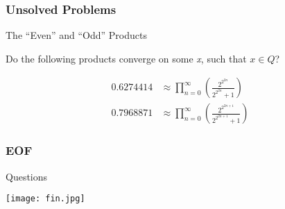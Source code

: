\documentclass{beamer}
\begin{document}
\begin{frame}
\frametitle{Unsolved Problems}
\begin{alertblock}
{The ``Even'' and ``Odd'' Products}

Do the following products converge on some \emph x, such that \(x \in Q\)?

\begin{equation}
\begin{aligned}
0.6274414 &\approx \prod_{n=0}^\infty \left ( \frac{2^{2^{2n}}}{2^{2^{2n}} + 1} \right )\\
0.7968871 &\approx \prod_{n=0}^\infty \left ( \frac{2^{2^{2n+1}}}{2^{2^{2n+1}} + 1} \right )
\end{aligned}
\end{equation}

\end{alertblock}

\end{frame}

\begin{frame}
\frametitle{EOF}
\begin{block}
{Questions}


\begin{center}
\texttt{[image: fin.jpg]}
\end{center}


\end{block}
\end{frame}


\begin{comment}

\begin{frame}
\frametitle{}
\begin{block}
{}

\end{block}
\end{frame}
\end{comment}

%
%
\end{document}
